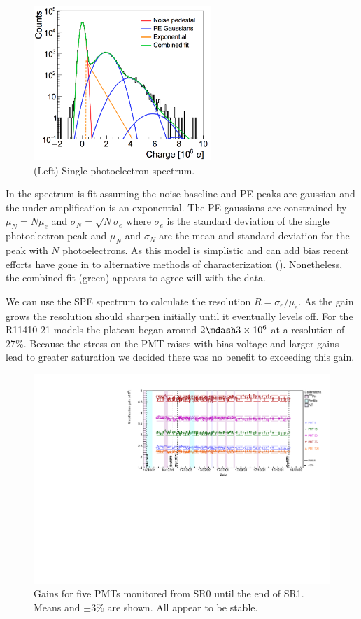 \begin{figure}
\centering
\includegraphics[width=0.6\textwidth]{SPESpectrum}
\caption{(Left) Single photoelectron spectrum.}
\label{fig:xenon1t_pmt_spe}
\end{figure}

In  the spectrum is fit assuming the noise baseline and PE peaks are gaussian and the under-amplification is
an exponential.  The PE gaussians are constrained by $\mu_{N} = N \mu_{e}$ and $\sigma_{N} = \sqrt{N} \sigma_{e}$ where $\sigma_{e}$ is the
standard deviation of the single photoelectron peak and $\mu_{N}$ and $\sigma_{N}$ are the mean and standard deviation for the peak with
$N$ photoelectrons.  As this model is simplistic and can add bias recent efforts have gone in to alternative methods
of characterization ().  Nonetheless, the combined fit (green) appears to agree will with the data.

We can use the SPE spectrum to calculate the resolution $R = \sigma_{e} / \mu_{e}$.  As the gain grows the resolution should sharpen
initially until it eventually levels off.  For the R11410-21 models the plateau began around $2 \mdash 3 \times 10^{6}$ at a resolution of
27\%.  Because the stress on the PMT raises with bias voltage and larger gains lead to greater saturation we decided there was no benefit
to exceeding this gain.

\begin{figure}
\centering
\includegraphics[width=\textwidth]{PMTGainStability}
\caption{Gains for five PMTs monitored from SR0 until the end of SR1.  Means and $\pm 3\%$ are shown.  All appear to be stable.}
\label{fig:xenon1t_pmt_time}
\end{figure}

